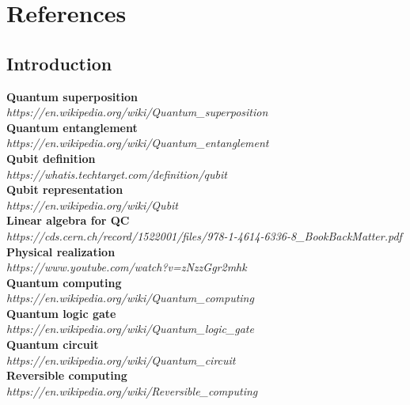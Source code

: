 \documentclass[main.tex]{subfiles}
\begin{document}
\section{References}
	\subsection{Introduction}
	\textbf{Quantum superposition}\\ \textit{https://en.wikipedia.org/wiki/Quantum\_superposition}\\
	\textbf{Quantum entanglement}\\ \textit{https://en.wikipedia.org/wiki/Quantum\_entanglement}\\
	\textbf{Qubit definition}\\ \textit{https://whatis.techtarget.com/definition/qubit}\\
	\textbf{Qubit representation}\\ \textit{https://en.wikipedia.org/wiki/Qubit}\\
	\textbf{Linear algebra for QC}\\ \textit{https://cds.cern.ch/record/1522001/files/978-1-4614-6336-8\_BookBackMatter.pdf}\\
	\textbf{Physical realization}\\ \textit{https://www.youtube.com/watch?v=zNzzGgr2mhk}\\
	\textbf{Quantum computing}\\
	\textit{https://en.wikipedia.org/wiki/Quantum\_computing}\\
	\textbf{Quantum logic gate}\\	
	\textit{https://en.wikipedia.org/wiki/Quantum\_logic\_gate}\\
	\textbf{Quantum circuit}\\
	\textit{https://en.wikipedia.org/wiki/Quantum\_circuit}\\
	\textbf{Reversible computing}\\
	\textit{https://en.wikipedia.org/wiki/Reversible\_computing}\\
\end{document}
